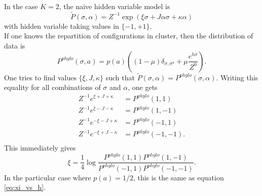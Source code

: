 \documentclass[10pt]{article}
\begin{document}
	In the case $K=2$, the naive hidden variable model is 
	$$\tilde{P}(\sigma,\alpha) = Z^{-1}\exp(\xi\sigma + J\alpha\sigma + \kappa\alpha)$$
	with hidden variable taking values in $\{-1,+1\}$.\\
	If one knows the repartition of configurations in cluster, then the distribution of data is 
	$$P^{phylo}(\sigma,a) = p(a)\left((1-\mu)\delta_{\sigma,\sigma^a} + \mu\frac{e^{h\sigma}}{Z^0}\right).$$
	One tries to find values $\{\xi,J,\kappa\}$ such that $\tilde{P}(\sigma,\alpha) = P^{phylo}(\sigma,\alpha)$. Writing this equality for all combinations of $\sigma$ and $\alpha$, one gets 
	\begin{align}
		Z^{-1}e^{\xi + J + \kappa} &= P^{phylo}(1,1)\\
		Z^{-1}e^{\xi - J - \kappa} &= P^{phylo}(1,-1)\\
		Z^{-1}e^{-\xi - J + \kappa} &= P^{phylo}(-1,1)\\
		Z^{-1}e^{-\xi + J - \kappa} &= P^{phylo}(-1,-1).\\
	\end{align}
	This immediately gives
	$$\xi = \frac{1}{4}\log\frac{P^{phylo}(1,1)P^{phylo}(1,-1)}{P^{phylo}(-1,1)P^{phylo}(-1,-1)}.$$
	In the particular case where $p(a) = 1/2$, this is the same as equation \ref{eq:xi_vs_h}. 
\end{document}
